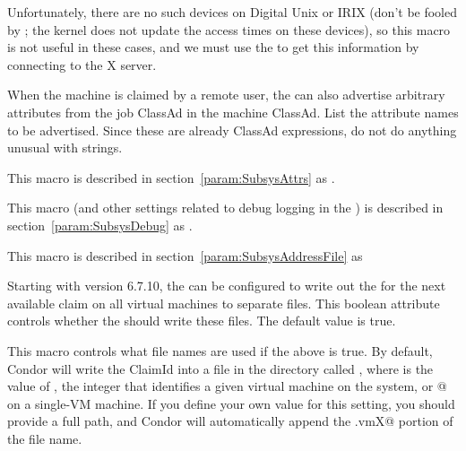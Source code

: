 \begin{description}
  Unfortunately, there are no such devices on Digital Unix or IRIX
  (don't be fooled by ; the kernel does not
  update the access times on these devices), so this macro is not
  useful in these cases, and we must use the  to get this
  information by connecting to the X server.
  
\item[\Macro{STARTD\_JOB\_EXPRS}] \label{param:StartdJobExprs} When
  the machine is claimed by a remote user, the  can also advertise
  arbitrary attributes from the job ClassAd in the machine
  ClassAd.
  List the attribute names to be advertised.  \Note Since
  these are already ClassAd expressions, do not do anything
  unusual with strings.

\item[\Macro{STARTD\_ATTRS}] \label{param:StartdAttrs} This macro is
  described in section~\ref{param:SubsysAttrs} as
  .

\item[\Macro{STARTD\_DEBUG}] \label{param:StartdDebug} This macro
  (and other settings related to debug logging in the ) is
  described in section~\ref{param:SubsysDebug} as
  .

\item[\Macro{STARTD\_ADDRESS\_FILE}] \label{param:StartdAddressFile}
  This macro is described in
  section~\ref{param:SubsysAddressFile} as

\item[\Macro{STARTD\_SHOULD\_WRITE\_CLAIM\_ID\_FILE}] \label{param:StartdShouldWriteClaimIdFile}
  Starting with version 6.7.10, the  can be configured
  to write out the  for the next available claim on all
  virtual machines to separate files.
  This boolean attribute controls whether the  should
  write these files.
  The default value is true.
  
\item[\Macro{STARTD\_CLAIM\_ID\_FILE}] \label{param:StartdClaimIdFile}
  This macro controls what file names are used if the above
   is true.  By
  default, Condor will write the ClaimId into a file in the
   directory called , where
  \verb@X@ is the value of , the integer that
  identifies a given virtual machine on the system, or @ on a
  single-VM machine.
  If you define your own value for this setting, you should provide a
  full path, and Condor will automatically append the \verb@.vmX@
  portion of the file name.


\end{description}
